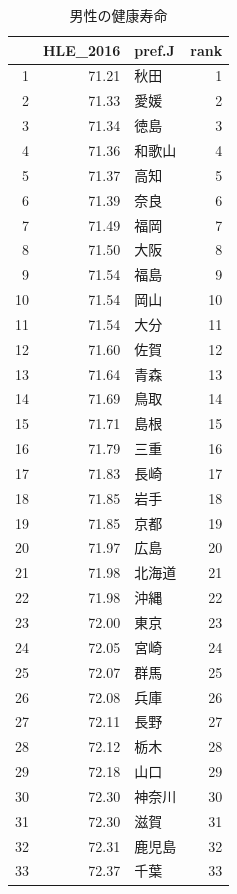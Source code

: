 \begin{table}[ht]
\centering
\footnotesize
\caption{男性の健康寿命}
\begin{tabular}{rrlr}
  \hline
 & HLE\_2016 & pref.J & rank \\ 
  \hline
1 & 71.21 & 秋田 &   1 \\ 
  2 & 71.33 & 愛媛 &   2 \\ 
  3 & 71.34 & 徳島 &   3 \\ 
  4 & 71.36 & 和歌山 &   4 \\ 
  5 & 71.37 & 高知 &   5 \\ 
  6 & 71.39 & 奈良 &   6 \\ 
  7 & 71.49 & 福岡 &   7 \\ 
  8 & 71.50 & 大阪 &   8 \\ 
  9 & 71.54 & 福島 &   9 \\ 
  10 & 71.54 & 岡山 &  10 \\ 
  11 & 71.54 & 大分 &  11 \\ 
  12 & 71.60 & 佐賀 &  12 \\ 
  13 & 71.64 & 青森 &  13 \\ 
  14 & 71.69 & 鳥取 &  14 \\ 
  15 & 71.71 & 島根 &  15 \\ 
  16 & 71.79 & 三重 &  16 \\ 
  17 & 71.83 & 長崎 &  17 \\ 
  18 & 71.85 & 岩手 &  18 \\ 
  19 & 71.85 & 京都 &  19 \\ 
  20 & 71.97 & 広島 &  20 \\ 
  21 & 71.98 & 北海道 &  21 \\ 
  22 & 71.98 & 沖縄 &  22 \\ 
  23 & 72.00 & 東京 &  23 \\ 
  24 & 72.05 & 宮崎 &  24 \\ 
  25 & 72.07 & 群馬 &  25 \\ 
  26 & 72.08 & 兵庫 &  26 \\ 
  27 & 72.11 & 長野 &  27 \\ 
  28 & 72.12 & 栃木 &  28 \\ 
  29 & 72.18 & 山口 &  29 \\ 
  30 & 72.30 & 神奈川 &  30 \\ 
  31 & 72.30 & 滋賀 &  31 \\ 
  32 & 72.31 & 鹿児島 &  32 \\ 
  33 & 72.37 & 千葉 &  33 \\ 

\end{tabular}
\end{table}
